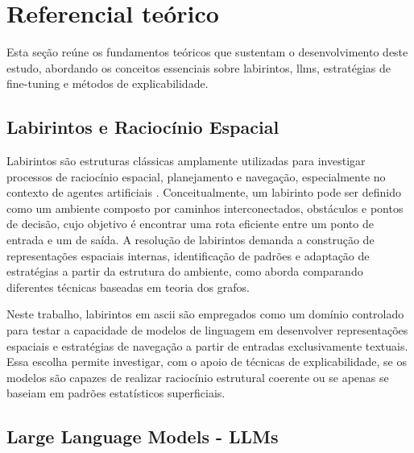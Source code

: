 \chapter{Referencial te\'orico}\label{cap:referencialTeorico}

Esta seção reúne os fundamentos teóricos que sustentam o desenvolvimento deste estudo, abordando os conceitos essenciais sobre labirintos, \gls{llms}, estratégias de fine-tuning e métodos de explicabilidade.

\section{Labirintos e Raciocínio Espacial}

Labirintos são estruturas clássicas amplamente utilizadas para investigar processos de raciocínio espacial, planejamento e navegação, especialmente no contexto de agentes artificiais \cite{vartak2023mazesolverrobot}. Conceitualmente, um labirinto pode ser definido como um ambiente composto por caminhos interconectados, obstáculos e pontos de decisão, cujo objetivo é encontrar uma rota eficiente entre um ponto de entrada e um de saída. A resolução de labirintos demanda a construção de representações espaciais internas, identificação de padrões e adaptação de estratégias a partir da estrutura do ambiente, como \cite{sadik2010comprehensive} aborda comparando diferentes técnicas baseadas em teoria dos grafos.

Neste trabalho, labirintos em \gls{ascii} são empregados como um domínio controlado para testar a capacidade de modelos de linguagem em desenvolver representações espaciais e estratégias de navegação a partir de entradas exclusivamente textuais. Essa escolha permite investigar, com o apoio de técnicas de explicabilidade, se os modelos são capazes de realizar raciocínio estrutural coerente ou se apenas se baseiam em padrões estatísticos superficiais.

\section{Large Language Models - LLMs}

